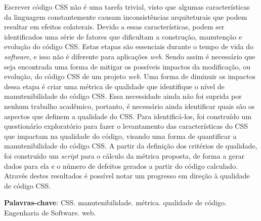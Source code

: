 %
%

\begin{resumo}

Escrever código CSS não é uma tarefa trivial, visto que algumas características da linguagem constantemente causam inconsistências arquiteturais que podem resultar em efeitos colaterais. Devido a essas características, podem ser identificados uma série de fatores que dificultam a construção, manutenção e evolução do código CSS. Estas etapas são essenciais durante o tempo de vida do \textit{software}, e isso não é diferente para aplicações \textit{web}. Sendo assim é necessário que seja encontrada uma forma de mitigar os possíveis impactos da modificação, ou evolução, do código CSS de um projeto \textit{web}. Uma forma de diminuir os impactos dessa etapa é criar uma métrica de qualidade que identifique o nível de manutenibilidade do código CSS. Essa necessidade ainda não foi suprida por nenhum trabalho acadêmico, portanto, é necessário ainda identificar quais são os aspectos que definem a qualidade do CSS. Para identificá-los, foi construído um questionário exploratório para fazer o levantamento das características do CSS que impactam na qualidade do código, visando uma forma de quantificar a manutenibilidade do código CSS. A partir da definição dos critérios de qualidade, foi construído um \textit{script} para o cálculo da métrica proposta, de forma a gerar dados para ela e o número de defeitos gerados a partir do código calculado. Através destes resultados é possível notar um progresso em direção à qualidade de código CSS. 

\textbf{Palavras-chave}: CSS. manutenibilidade. métrica. qualidade de código. Engenharia de Software. web.

\end{resumo}
